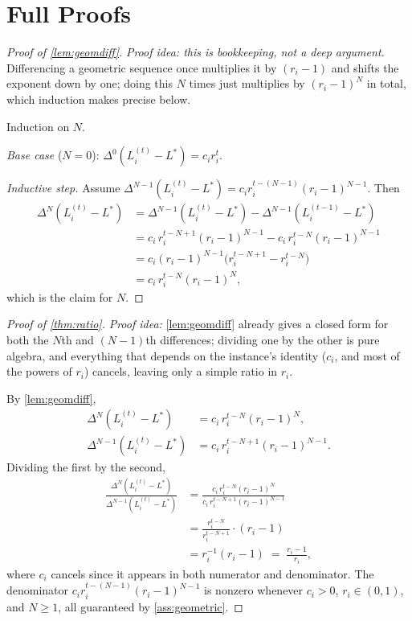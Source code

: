 \documentclass{article}
\theoremstyle{plain}
\theoremstyle{definition}
\theoremstyle{remark}
\begin{document}



\newpage
\appendix
\onecolumn

\section{Full Proofs}
\label{app:proofs}

\begin{proof}[Proof of \cref{lem:geomdiff}]
\emph{Proof idea: this is bookkeeping, not a deep argument.} Differencing a geometric sequence once multiplies it by $(r_i-1)$ and shifts the exponent down by one; doing this $N$ times just multiplies by $(r_i-1)^N$ in total, which induction makes precise below.

Induction on $N$.

\emph{Base case} ($N=0$): $\Delta^0(L_i^{(t)}-L^*) = c_i r_i^t$.

\emph{Inductive step.} Assume $\Delta^{N-1}(L_i^{(t)}-L^*) = c_i r_i^{t-(N-1)}(r_i-1)^{N-1}$. Then
\begin{align*}
\Delta^N(L_i^{(t)}-L^*) &= \Delta^{N-1}(L_i^{(t)}-L^*) - \Delta^{N-1}(L_i^{(t-1)}-L^*) \\
&= c_i\, r_i^{t-N+1}(r_i-1)^{N-1} - c_i\, r_i^{t-N}(r_i-1)^{N-1} \\
&= c_i(r_i-1)^{N-1}\big(r_i^{t-N+1}-r_i^{t-N}\big) \\
&= c_i\,r_i^{t-N}(r_i-1)^N,
\end{align*}
which is the claim for $N$.
\end{proof}

\begin{proof}[Proof of \cref{thm:ratio}]
\emph{Proof idea:} \cref{lem:geomdiff} already gives a closed form for both the $N$th and $(N-1)$th differences; dividing one by the other is pure algebra, and everything that depends on the instance's identity ($c_i$, and most of the powers of $r_i$) cancels, leaving only a simple ratio in $r_i$.

By \cref{lem:geomdiff},
\begin{align*}
\Delta^N(L_i^{(t)}-L^*) &= c_i\, r_i^{t-N}(r_i-1)^N, \\
\Delta^{N-1}(L_i^{(t)}-L^*) &= c_i\, r_i^{t-N+1}(r_i-1)^{N-1}.
\end{align*}
Dividing the first by the second,
\begin{align*}
\frac{\Delta^N(L_i^{(t)}-L^*)}{\Delta^{N-1}(L_i^{(t)}-L^*)}
&= \frac{c_i\, r_i^{t-N}(r_i-1)^N}{c_i\, r_i^{t-N+1}(r_i-1)^{N-1}} \\
&= \frac{r_i^{t-N}}{r_i^{t-N+1}}\cdot(r_i-1) \\
&= r_i^{-1}(r_i-1) \;=\; \frac{r_i-1}{r_i},
\end{align*}
where $c_i$ cancels since it appears in both numerator and denominator. The denominator $c_i r_i^{t-(N-1)}(r_i-1)^{N-1}$ is nonzero whenever $c_i>0$, $r_i\in(0,1)$, and $N\ge1$, all guaranteed by \cref{ass:geometric}.
\end{proof}
\end{document}
